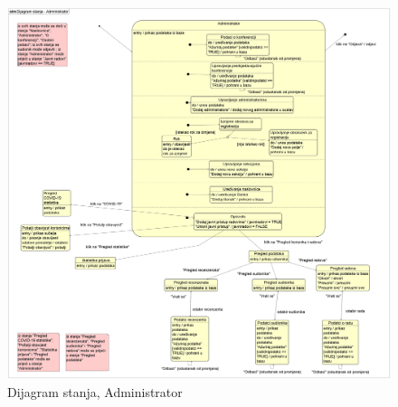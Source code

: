		\begin{figure}[H]
			\includegraphics[height= 15 cm, width=15 cm]{dijagrami/Dijagram stanja - Administrator2.png} 
			\centering
			\caption{Dijagram stanja, Administrator}
			\label{fig:stanje3}
		\end{figure}
	
